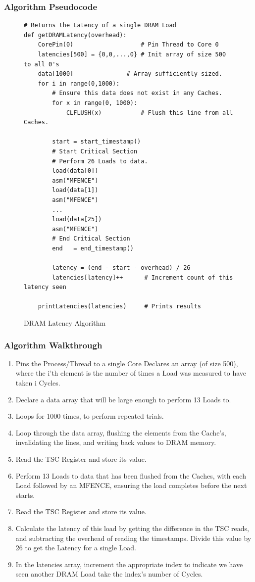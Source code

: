 \documentclass[bsc,frontabs,twoside,singlespacing,parskip,deptreport]{infthesis}     %
\begin{document}
\subsubsection{Algorithm Pseudocode}
\begin{figure}[h!]
    \begin{verbatim}
# Returns the Latency of a single DRAM Load
def getDRAMLatency(overhead):
    CorePin(0)                   # Pin Thread to Core 0
    latencies[500] = {0,0,...,0} # Init array of size 500 to all 0's
    data[1000]               # Array sufficiently sized.    
    for i in range(0,1000):
        # Ensure this data does not exist in any Caches.
        for x in range(0, 1000):
            CLFLUSH(x)           # Flush this line from all Caches.
            
        start = start_timestamp()
        # Start Critical Section
        # Perform 26 Loads to data.
        load(data[0])
        asm("MFENCE")
        load(data[1])
        asm("MFENCE")
        ...
        load(data[25])
        asm("MFENCE")
        # End Critical Section
        end   = end_timestamp()
        
        latency = (end - start - overhead) / 26
        latencies[latency]++      # Increment count of this latency seen
        
    printLatencies(latencies)     # Prints results
    \end{verbatim}
    \caption{DRAM Latency Algorithm}
    \label{fig:dram-lat-algo}
\end{figure}
\subsubsection{Algorithm Walkthrough}
\begin{enumerate}
    \item Pins the Process/Thread to a single Core
    Declares an array (of size 500), where the i'th element is the number of times a Load was measured to have taken i Cycles.
    \item Declare a data array that will be large enough to perform 13 Loads to.
    \item Loops for 1000 times, to perform repeated trials.
    \item Loop through the data array, flushing the elements from the Cache's, invalidating the lines, and writing back values to DRAM memory.
    \item Read the TSC Register and store its value.
    \item Perform 13 Loads to data that has been flushed from the Caches, with each Load followed by an MFENCE\cite{mfence_spec}, ensuring the load completes before the next starts.
    \item Read the TSC Register and store its value.
    \item Calculate the latency of this load by getting the difference in the TSC reads, and subtracting the overhead of reading the timestamps. Divide this value by 26 to get the Latency for a single Load.
    \item In the latencies array, increment the appropriate index to indicate we have seen another DRAM Load take the index's number of Cycles.
\end{enumerate}
\end{document}

